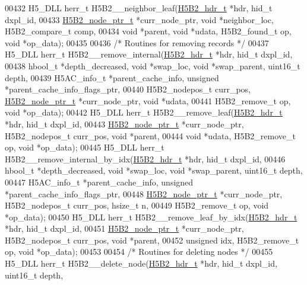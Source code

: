 \begin{DoxyCode}
{{00432 H5\_DLL herr\_t H5B2\_\_neighbor\_leaf(\hyperlink{struct_h5_b2__hdr__t}{H5B2\_hdr\_t} *hdr, hid\_t dxpl\_id,
00433     \hyperlink{struct_h5_b2__node__ptr__t}{H5B2\_node\_ptr\_t} *curr\_node\_ptr, \textcolor{keywordtype}{void} *neighbor\_loc, H5B2\_compare\_t comp,
00434     \textcolor{keywordtype}{void} *parent, \textcolor{keywordtype}{void} *udata, H5B2\_found\_t op, \textcolor{keywordtype}{void} *op\_data);
00435 
00436 \textcolor{comment}{/* Routines for removing records */}
00437 H5\_DLL herr\_t H5B2\_\_remove\_internal(\hyperlink{struct_h5_b2__hdr__t}{H5B2\_hdr\_t} *hdr, hid\_t dxpl\_id,
00438     hbool\_t *depth\_decreased, \textcolor{keywordtype}{void} *swap\_loc, \textcolor{keywordtype}{void} *swap\_parent, uint16\_t depth,
00439     H5AC\_info\_t *parent\_cache\_info, \textcolor{keywordtype}{unsigned} *parent\_cache\_info\_flags\_ptr,
00440     H5B2\_nodepos\_t curr\_pos, \hyperlink{struct_h5_b2__node__ptr__t}{H5B2\_node\_ptr\_t} *curr\_node\_ptr, \textcolor{keywordtype}{void} *udata,
00441     H5B2\_remove\_t op, \textcolor{keywordtype}{void} *op\_data);
00442 H5\_DLL herr\_t H5B2\_\_remove\_leaf(\hyperlink{struct_h5_b2__hdr__t}{H5B2\_hdr\_t} *hdr, hid\_t dxpl\_id,
00443     \hyperlink{struct_h5_b2__node__ptr__t}{H5B2\_node\_ptr\_t} *curr\_node\_ptr, H5B2\_nodepos\_t curr\_pos, \textcolor{keywordtype}{void} *parent,
00444     \textcolor{keywordtype}{void} *udata, H5B2\_remove\_t op, \textcolor{keywordtype}{void} *op\_data);
00445 H5\_DLL herr\_t H5B2\_\_remove\_internal\_by\_idx(\hyperlink{struct_h5_b2__hdr__t}{H5B2\_hdr\_t} *hdr, hid\_t dxpl\_id,
00446     hbool\_t *depth\_decreased, \textcolor{keywordtype}{void} *swap\_loc, \textcolor{keywordtype}{void} *swap\_parent, uint16\_t depth,
00447     H5AC\_info\_t *parent\_cache\_info, \textcolor{keywordtype}{unsigned} *parent\_cache\_info\_flags\_ptr,
00448     \hyperlink{struct_h5_b2__node__ptr__t}{H5B2\_node\_ptr\_t} *curr\_node\_ptr, H5B2\_nodepos\_t curr\_pos, hsize\_t n,
00449     H5B2\_remove\_t op, \textcolor{keywordtype}{void} *op\_data);
00450 H5\_DLL herr\_t H5B2\_\_remove\_leaf\_by\_idx(\hyperlink{struct_h5_b2__hdr__t}{H5B2\_hdr\_t} *hdr, hid\_t dxpl\_id,
00451     \hyperlink{struct_h5_b2__node__ptr__t}{H5B2\_node\_ptr\_t} *curr\_node\_ptr, H5B2\_nodepos\_t curr\_pos, \textcolor{keywordtype}{void} *parent,
00452     \textcolor{keywordtype}{unsigned} idx, H5B2\_remove\_t op, \textcolor{keywordtype}{void} *op\_data);
00453 
00454 \textcolor{comment}{/* Routines for deleting nodes */}
00455 H5\_DLL herr\_t H5B2\_\_delete\_node(\hyperlink{struct_h5_b2__hdr__t}{H5B2\_hdr\_t} *hdr, hid\_t dxpl\_id, uint16\_t depth,
}}
\end{DoxyCode}
